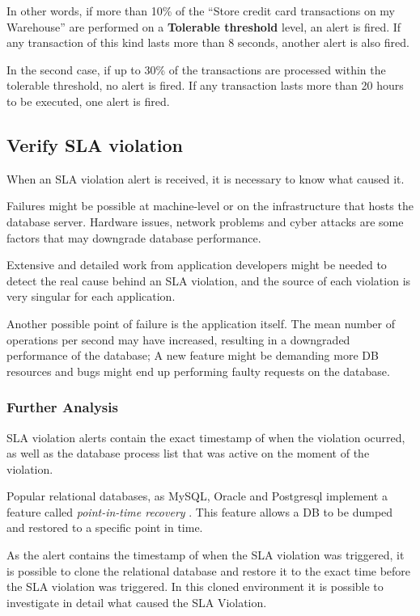 In other words, if more than 10\% of the ``Store credit card transactions on my Warehouse'' are performed on a \textbf{Tolerable threshold} level, an alert is fired. If any transaction of this kind lasts more than 8 seconds, another alert is also fired. 

In the second case, if up to 30\% of the transactions are processed within the tolerable threshold, no alert is fired. If any transaction lasts more than 20 hours to be executed, one alert is fired.

\subsection {Verify SLA violation}

When an SLA violation alert is received, it is necessary to know what caused it.

Failures might be possible at machine-level or on the infrastructure that hosts the database server. Hardware issues, network problems and cyber attacks are some factors that may downgrade database performance.  

Extensive and detailed work from application developers might be needed to detect the real cause behind an SLA violation, and the source of each violation is very singular for each application.

Another possible point of failure is the application itself. The mean number of operations per second may have increased, resulting in a downgraded performance of the database; A new feature might be demanding more DB resources and bugs might end up performing faulty requests on the database.

\subsubsection{Further Analysis}
SLA violation alerts contain the exact timestamp of when the violation ocurred, as well as the database process list that was active on the moment of the violation. 

Popular relational databases, as MySQL, Oracle and Postgresql implement a feature called \textit{point-in-time recovery} \cite{pitrmysql} \cite{pitroracle} \cite{pitrposgres}. This feature allows a DB to be dumped and restored to a specific point in time.

As the alert contains the timestamp of when the SLA violation was triggered, it is possible to clone the relational database and restore it to the exact time before the SLA violation was triggered. In this cloned environment it is possible to investigate in detail what caused the SLA Violation. 

